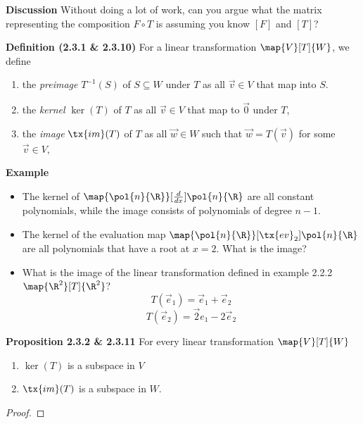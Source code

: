 \documentclass[letterpaper, 10pt]{article}
\begin{document}
\vspace{200pt}
\lb
\textbf{Discussion}
\lb
Without doing a lot of work, can you argue what the matrix
representing the composition $F \circ T$ is assuming you know $[F]$ and $[T]$?






\newpage

\lb
\textbf{Definition (2.3.1 \& 2.3.10)}
\lb
For a linear transformation $ \map{V}[T]{W}$, we define
\begin{enumerate}
    \item
        the \emph{preimage} $T^{-1}(S)$ of $S \subseteq W$ under $T$ as all $\vec v ∈ V$ that map into $S$.
    \item
        the \emph{kernel} $\ker(T)$ of $T$  as all $\vec v ∈ V$ that map to $\vec 0$ under $T$,
    \item 
        the \emph{image} $\tx{im}(T)$ of $T$ as all $\vec w ∈ W$ such that $\vec w = T(\vec v)$ for some $\vec v ∈ V$,
\end{enumerate}




\lb
\textbf{Example}
\begin{itemize}
    \item
    The kernel of $\map{\pol{n}{\R}}[\frac{d}{dx}]{\pol{n}{\R}}$ are all constant polynomials,
    while the image consists of polynomials of degree $n-1$.

    \item
    The kernel of the evaluation map $\map{\pol{n}{\R}}[\tx{ev}_2]{\pol{n}{\R}}$ are all
    polynomials that have a root at $x = 2$. What is the image?

    \item
    What is the image of the linear transformation defined in example 2.2.2 $\map{\R^2}[T]{\R^2}$?
    \[ T(\vec e_1) = \vec e_1 + \vec e_2 \]
    \[ T(\vec e_2) = \vec 2 e_1 - 2 \vec e_2 \]
\end{itemize}


\newpage
\lb
\textbf{Proposition 2.3.2 \& 2.3.11}
\lb
For every linear transformation $\map{V}[T]{W}$
\begin{enumerate}
    \item $\ker(T)$ is a subspace in $V$
    \item $\tx{im}(T)$ is a subspace in $W$.
\end{enumerate}
\begin{proof}
\end{proof}
\end{document}
